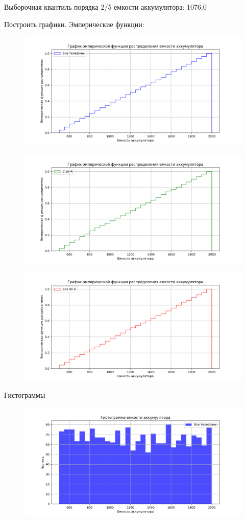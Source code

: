 \documentclass{article}
\begin{document}
Выборочная квантиль порядка 2/5 емкости аккумулятора: 1076.0

Построить графики.
Эмперические функции:
\begin{figure}[H]
      \centering
      \includegraphics[width=0.5\linewidth]{Python/emper-all-phones}\label{fig:figure4}
\end{figure}

\begin{figure}[H]
      \centering
      \includegraphics[width=0.5\linewidth]{Python/emper-wi-fi}\label{fig:figure5}
\end{figure}

\begin{figure}[H]
      \centering
      \includegraphics[width=0.5\linewidth]{Python/emper-without-wifi}\label{fig:figure6}
\end{figure}

Гистограммы
\begin{figure}[H]
      \centering
      \includegraphics[width=0.5\linewidth]{Python/hist-all-phones}\label{fig:figure7}
\end{figure}
\end{document}
